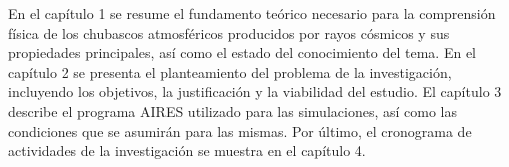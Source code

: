 %
%

En el capítulo 1 se resume el fundamento teórico necesario para la comprensión física de los chubascos atmosféricos producidos por rayos cósmicos y sus propiedades principales, así como el estado del conocimiento del tema. En el capítulo 2 se presenta el planteamiento del problema de la investigación, incluyendo los objetivos, la justificación y la viabilidad del estudio. El capítulo 3 describe el programa AIRES utilizado para las simulaciones, así como las condiciones que se asumirán para las mismas. Por último, el cronograma de actividades de la investigación se muestra en el capítulo 4.




\singlespace